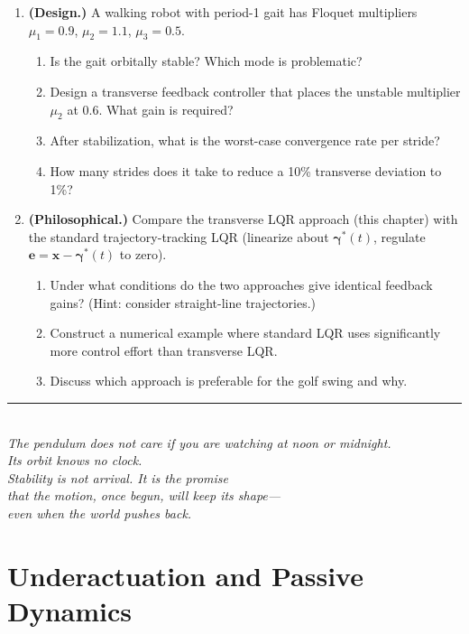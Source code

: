 \documentclass[12pt, openany]{book}
\theoremstyle{plain}
\newcommand{\state}{\bm{x}}
\newcommand{\traj}{\bm{\gamma}}
\begin{document}
\begin{enumerate}[label=\textbf{4.\arabic*.}, leftmargin=1.5cm]
\item \textbf{(Design.)} A walking robot with period-1 gait has Floquet
  multipliers $\mu_1 = 0.9$, $\mu_2 = 1.1$, $\mu_3 = 0.5$.
  \begin{enumerate}[label=(\alph*)]
    \item Is the gait orbitally stable? Which mode is problematic?
    \item Design a transverse feedback controller that places the unstable
      multiplier $\mu_2$ at $0.6$. What gain is required?
    \item After stabilization, what is the worst-case convergence rate
      per stride?
    \item How many strides does it take to reduce a 10\% transverse
      deviation to 1\%?
  \end{enumerate}

\item \textbf{(Philosophical.)} Compare the transverse LQR approach
  (this chapter) with the standard trajectory-tracking LQR (linearize about
  $\traj^*(t)$, regulate $\bm{e} = \state - \traj^*(t)$ to zero).
  \begin{enumerate}[label=(\alph*)]
    \item Under what conditions do the two approaches give identical feedback
      gains? (Hint: consider straight-line trajectories.)
    \item Construct a numerical example where standard LQR uses significantly
      more control effort than transverse LQR.
    \item Discuss which approach is preferable for the golf swing and why.
  \end{enumerate}

\end{enumerate}

\vspace{1cm}
\begin{center}
  \rule{0.5\textwidth}{0.4pt}\\[0.5cm]
  {\small\itshape
  The pendulum does not care if you are watching at noon or midnight.\\
  Its orbit knows no clock.\\[0.2cm]
  Stability is not arrival. It is the promise\\
  that the motion, once begun, will keep its shape---\\
  even when the world pushes back.}
\end{center}

\chapter{Underactuation and Passive Dynamics}
\end{document}
